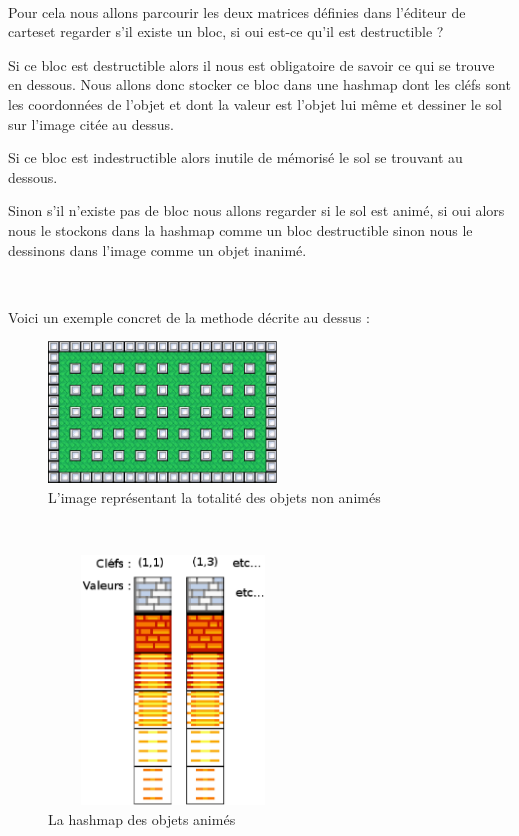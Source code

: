 			$\,$
			
			Pour cela nous allons parcourir les deux matrices définies dans l'éditeur de
			cartes\footnotemark[2] et regarder s'il existe un bloc, si oui est-ce
			qu'il est destructible ?
			
			Si ce bloc est destructible alors il nous est obligatoire de savoir ce qui se
			trouve en dessous.
			Nous allons donc stocker ce bloc dans une hashmap dont les cléfs sont les
			coordonnées de l'objet et dont la valeur est l'objet lui même et dessiner le
			sol sur l'image citée au dessus.
			
			Si ce bloc est indestructible alors inutile de mémorisé le sol se trouvant
			au dessous.
			
			Sinon s'il n'existe pas de bloc nous allons regarder si le sol est animé, si
			oui alors nous le stockons dans la hashmap comme un bloc destructible sinon
			nous le dessinons dans l'image comme un objet inanimé.
			
			$\,$
			
			Voici un exemple concret de la methode décrite au dessus :
				

			\begin{figure}[!h]			
				\begin{center}			
					\includegraphics[width=229px, height=142px]{Developpement/Img/map.eps}
					\caption{L'image représentant la totalité des objets non animés}
				\end{center}
			\end{figure}
			
			$\,$			

			\begin{figure}[!h]			
				\begin{center}						
					\includegraphics[width=250px, height=250px]{Developpement/Img/hashmap.eps}
					\caption{La hashmap des objets animés}
				\end{center}
			\end{figure}

